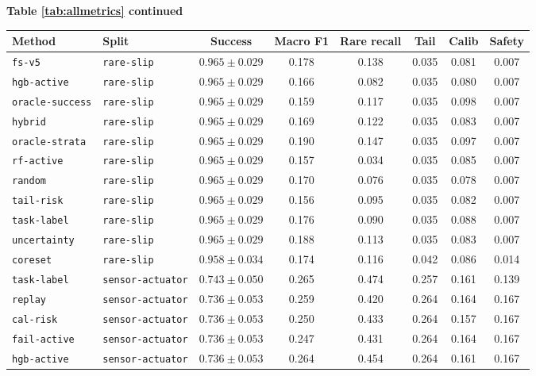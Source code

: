 \documentclass{article}
\begin{document}
\begin{center}
\textbf{Table \ref{tab:allmetrics} continued}\\[0.4ex]
\begin{tabular}{llcccccc}
\toprule
Method & Split & Success & Macro F1 & Rare recall & Tail & Calib & Safety \\
\midrule
\texttt{fs-v5} & \texttt{rare-slip} & $0.965 \pm 0.029$ & 0.178 & 0.138 & 0.035 & 0.081 & 0.007 \\
\texttt{hgb-active} & \texttt{rare-slip} & $0.965 \pm 0.029$ & 0.166 & 0.082 & 0.035 & 0.080 & 0.007 \\
\texttt{oracle-success} & \texttt{rare-slip} & $0.965 \pm 0.029$ & 0.159 & 0.117 & 0.035 & 0.098 & 0.007 \\
\texttt{hybrid} & \texttt{rare-slip} & $0.965 \pm 0.029$ & 0.169 & 0.122 & 0.035 & 0.083 & 0.007 \\
\texttt{oracle-strata} & \texttt{rare-slip} & $0.965 \pm 0.029$ & 0.190 & 0.147 & 0.035 & 0.097 & 0.007 \\
\texttt{rf-active} & \texttt{rare-slip} & $0.965 \pm 0.029$ & 0.157 & 0.034 & 0.035 & 0.085 & 0.007 \\
\texttt{random} & \texttt{rare-slip} & $0.965 \pm 0.029$ & 0.170 & 0.076 & 0.035 & 0.078 & 0.007 \\
\texttt{tail-risk} & \texttt{rare-slip} & $0.965 \pm 0.029$ & 0.156 & 0.095 & 0.035 & 0.082 & 0.007 \\
\texttt{task-label} & \texttt{rare-slip} & $0.965 \pm 0.029$ & 0.176 & 0.090 & 0.035 & 0.088 & 0.007 \\
\texttt{uncertainty} & \texttt{rare-slip} & $0.965 \pm 0.029$ & 0.188 & 0.113 & 0.035 & 0.083 & 0.007 \\
\texttt{coreset} & \texttt{rare-slip} & $0.958 \pm 0.034$ & 0.174 & 0.116 & 0.042 & 0.086 & 0.014 \\
\texttt{task-label} & \texttt{sensor-actuator} & $0.743 \pm 0.050$ & 0.265 & 0.474 & 0.257 & 0.161 & 0.139 \\
\texttt{replay} & \texttt{sensor-actuator} & $0.736 \pm 0.053$ & 0.259 & 0.420 & 0.264 & 0.164 & 0.167 \\
\texttt{cal-risk} & \texttt{sensor-actuator} & $0.736 \pm 0.053$ & 0.250 & 0.433 & 0.264 & 0.157 & 0.167 \\
\texttt{fail-active} & \texttt{sensor-actuator} & $0.736 \pm 0.053$ & 0.247 & 0.431 & 0.264 & 0.164 & 0.167 \\
\texttt{hgb-active} & \texttt{sensor-actuator} & $0.736 \pm 0.053$ & 0.264 & 0.454 & 0.264 & 0.161 & 0.167 \\

\end{tabular}
\end{center}
\end{document}
